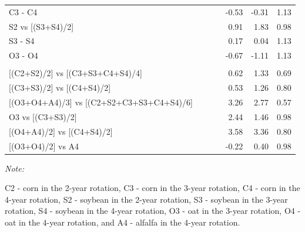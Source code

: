 \documentclass[
]{article}
\begin{document}
\begin{table}
\begin{threeparttable}
\begin{tabular}[t]{lrrrrrr}
\hspace{1em}\hspace{1em}C3 - C4 &  &  &  & -0.53 & -0.31 & 1.13\\
 
\hspace{1em}\hspace{1em}S2 vs [(S3+S4)/2] &  &  &  & 0.91 & 1.83 & 0.98\\
 
\hspace{1em}\hspace{1em}S3 - S4 &  &  &  & 0.17 & 0.04 & 1.13\\
 
\hspace{1em}\hspace{1em}O3 - O4 &  &  &  & -0.67 & -1.11 & 1.13\\
 
\addlinespace[0.3em]
\multicolumn{7}{l}{\textbf{(B3) - Crop type effects}}\\
\hspace{1em}\hspace{1em}{}[(C2+S2)/2] vs [(C3+S3+C4+S4)/4] &  &  &  & 0.62 & 1.33 & 0.69\\
 
\hspace{1em}\hspace{1em}{}[(C3+S3)/2] vs [(C4+S4)/2] &  &  &  & 0.53 & 1.26 & 0.80\\
 
\hspace{1em}\hspace{1em}{}[(O3+O4+A4)/3] vs [(C2+S2+C3+S3+C4+S4)/6] &  &  &  & 3.26 & 2.77 & 0.57\\
 
\hspace{1em}\hspace{1em}O3 vs [(C3+S3)/2] &  &  &  & 2.44 & 1.46 & 0.98\\
 
\hspace{1em}\hspace{1em}{}[(O4+A4)/2] vs [(C4+S4)/2] &  &  &  & 3.58 & 3.36 & 0.80\\
 
\hspace{1em}\hspace{1em}{}[(O3+O4)/2] vs A4 &  &  &  & -0.22 & 0.40 & 0.98\\
\bottomrule
\end{tabular}
\begin{tablenotes}[para]
\item \textit{Note: } 
\item C2 - corn in the 2-year rotation, C3 - corn in the 3-year rotation, C4 - corn in the 4-year rotation, S2 - soybean in the 2-year rotation, S3 - soybean in the 3-year rotation, S4 - soybean in the 4-year rotation, O3 - oat in the 3-year rotation, O4 - oat in the 4-year rotation, and A4 - alfalfa in the 4-year rotation.
\end{tablenotes}
\end{threeparttable}
\end{table}
\end{document}
